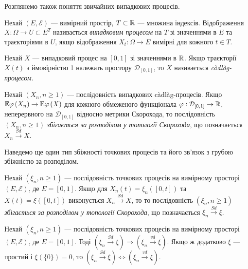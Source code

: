 Розглянемо також поняття звичайних випадкових процесів.

\begin{definition}
    Нехай $\left(E, \mathcal{E}\right)$ --- вимірний простір,
    $T \subset \mathbb{R}$ --- множина індексів. Відображення
    $X : \Omega \to U \subset E^T$ називається \emph{випадковим процесом}
    на $T$ зі значеннями в $E$ та траєкторіями в $U$,
    якщо відображення $X_t : \Omega \to E$ вимірні для кожного $t \in T$.
\end{definition}

\begin{definition}
    Нехай $X$ --- випадковий процес на $[0, 1]$ зі значеннями в $\mathbb{R}$. Якщо
    траєкторії $X(t)$ з ймовірністю 1 належать простору $\mathcal{D}_{[0, 1]}$,
    то $X$ називається \emph{càdlàg-процесом}.
\end{definition}

\begin{definition}
    Нехай $\left(X_n, n \geq 1\right)$ --- послідовність випадкових
    càdlàg-процесів. Якщо 
    $\mathbb{E} \varphi \left(X_n\right) \to \mathbb{E} \varphi \left(X\right)$
    для кожного обмеженого функціонала
    $\varphi: \mathcal{D}_{[0, 1]} \to \mathbb{R}$, 
    неперервного на $\mathcal{D}_{[0, 1]}$ 
    відносно метрики Скорохода,
    то послідовність $\left(X_n, n \geq 1\right)$
    \emph{збігається за розподілом у топології Скорохода},
    що позначається
    $X_n \overset{Sd}{\longrightarrow} X$.
\end{definition}

Наведемо ще один тип збіжності точкових процесів та його зв'язок
з грубою збіжністю за розподілом.

\begin{definition}
    Нехай $\left(\xi_n, n \geq 1\right)$ --- послідовність 
    точкових процесів на вимірному просторі $\left(E, \mathcal{E}\right)$,
    де $E = [0, 1]$.
    Якщо для $X_n (t) = \xi_n \left([0, t]\right)$ та
    $X (t) = \xi \left([0, t]\right)$ виконується
    $X_n \overset{Sd}{\longrightarrow} X$, то
    то послідовність $\left(\xi_n, n \geq 1\right)$
    \emph{збігається за розподілом у топології Скорохода}, 
    що позначається
    $\xi_n \overset{Sd}{\longrightarrow} \xi$.
\end{definition}

\begin{theorem}\label{th:Skorohod_conv}
    Нехай $\left(\xi_n, n \geq 1\right)$ --- послідовність 
    точкових процесів на вимірному просторі $\left(E, \mathcal{E}\right)$,
    де $E = [0, 1]$.
    Тоді 
    $\left(\xi_n \overset{Sd}{\longrightarrow} \xi\right) \Rightarrow \left(\xi_n \overset{vd}{\longrightarrow} \xi\right)$. 
    Якщо ж
    додатково $\xi$ --- простий і $\xi\left(\{ 0\}\right) = 0$, 
    то
    $\left(\xi_n \overset{Sd}{\longrightarrow} \xi\right) \Leftrightarrow \left(\xi_n \overset{vd}{\longrightarrow} \xi\right)$. 
\end{theorem}